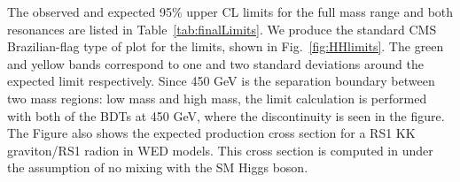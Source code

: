 The observed and expected 95\% upper CL limits for the full mass range
and both resonances are listed in Table~\ref{tab:finalLimits}. We produce the standard CMS Brazilian-flag type of plot for the limits, shown in Fig.~\ref{fig:HHlimits}. The green and yellow
bands correspond to one and two standard deviations around
the expected limit respectively. Since 450 GeV is the separation boundary between two mass regions: low mass and high mass, the limit calculation is performed with both of the BDTs at 450 GeV, where the discontinuity is
seen in the figure. The Figure also shows the expected production
cross section for a RS1 KK graviton/RS1 radion in WED models. %
This cross section is computed in \cite{Oliveira:2014kla}
under the assumption of no mixing with the SM Higgs boson.











